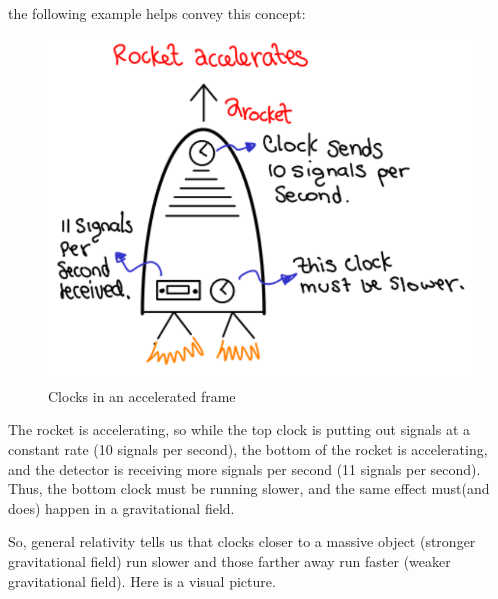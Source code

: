 \documentclass[12pt, letterpaper]{article}
\begin{document}
    \medskip
    the following example helps convey this concept:
     \begin{figure}[h!]
        \caption{Clocks in an accelerated frame}
        \centering
        \includegraphics[scale=0.5]{rocket_accelerates_clock.pdf}
    \end{figure}      
    
    The rocket is accelerating, so while the top clock is putting out signals 
    at a constant rate (10 signals per second), the bottom of the rocket 
    is accelerating, and the detector is receiving more signals per second
    (11 signals per second). Thus, the bottom clock must be running slower, 
    and the same effect must(and does) happen in a gravitational field.
    
    \medskip
    So, general relativity tells us that clocks closer to a massive object 
    (stronger gravitational field) run slower and those farther away run 
    faster (weaker gravitational field). Here is a visual picture.
\end{document}
